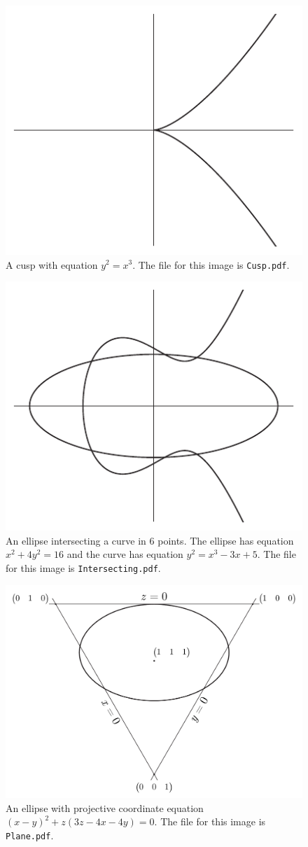 \begin{figure}
\centering
\includegraphics[width=0.4\linewidth]{Cusp/Cusp}
\caption{A cusp with equation $ y^{2} = x^{3} $. The file for this image is \texttt{Cusp.pdf}.}
\label{fig:Cusp}
\end{figure}


\begin{figure}
\centering
\includegraphics[width=0.4\linewidth]{Intersecting/Intersecting}
\caption{An ellipse intersecting a curve in 6 points. The ellipse has equation $ x^{2} + 4 y^{2} = 16 $ and the curve has equation $ y^{2} = x^{3} - 3 x + 5 $. The file for this image is \texttt{Intersecting.pdf}.}
\label{fig:Intersecting}
\end{figure}


\begin{figure}
\centering
\includegraphics[width=0.7\linewidth]{Plane/Plane}
\caption{An ellipse with projective coordinate equation $ (x - y)^{2} + z(3z - 4x - 4y) = 0 $. The file for this image is \texttt{Plane.pdf}.}
\label{fig:Plane}
\end{figure}

